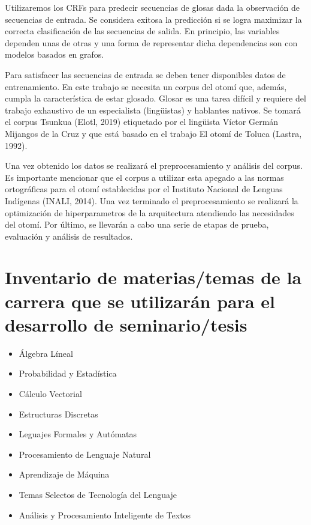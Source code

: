 \documentclass{article}
\begin{document}
Utilizaremos los CRFs para predecir secuencias de glosas dada la observación de
secuencias de entrada. Se considera exitosa la predicción si se logra maximizar
la correcta clasificación de las secuencias de salida.  En principio, las
variables dependen unas de otras y una forma de representar dicha dependencias
son con modelos basados en grafos. 

Para satisfacer las secuencias de entrada se deben tener disponibles datos de
entrenamiento. En este trabajo se necesita un corpus del otomí que, además,
cumpla la característica de estar glosado. Glosar es una tarea difícil y
requiere del trabajo exhaustivo de un especialista (lingüistas) y hablantes
nativos. Se tomará el corpus Tsunkua (Elotl, 2019) etiquetado por el lingüista
Víctor Germán Mijangos de la Cruz y que está basado en el trabajo El otomí de
Toluca (Lastra, 1992). 

Una vez obtenido los datos se realizará el preprocesamiento y análisis del
corpus.  Es importante mencionar que el corpus a utilizar esta apegado a las
normas ortográficas para el otomí establecidas por el Instituto Nacional de
Lenguas Indígenas (INALI, 2014). Una vez terminado el preprocesamiento se
realizará la optimización de hiperparametros de la arquitectura atendiendo las
necesidades del otomí. Por último, se llevarán a cabo una serie de etapas de
prueba, evaluación y análisis de resultados. 

\section{Inventario de materias/temas de la carrera que se utilizarán para el desarrollo de seminario/tesis}

\begin{itemize}
    \item Álgebra Líneal
    \item Probabilidad y Estadística
    \item Cálculo Vectorial
    \item Estructuras Discretas
    \item Leguajes Formales y Autómatas
    \item Procesamiento de Lenguaje Natural
    \item Aprendizaje de Máquina
    \item Temas Selectos de Tecnología del Lenguaje
    \item Análisis y Procesamiento Inteligente de Textos
\end{itemize}
\end{document}
